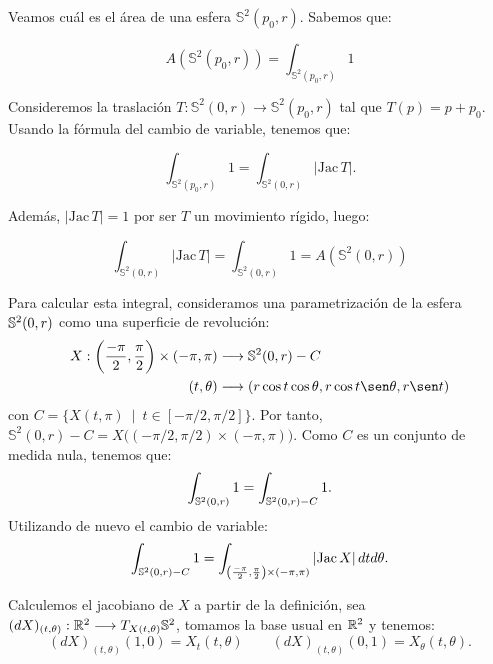 \begin{remark}
Veamos cuál es el área de una esfera $\mathbb{S}^2(p_0, r)$. Sabemos que:

\begin{equation*}
    A(\mathbb{S}^2(p_0, r)) = \int_{\mathbb{S}^2(p_0, r)} 1
\end{equation*}

Consideremos la traslación $T: \mathbb{S}^2(0, r) \longrightarrow \mathbb{S}^2(p_0, r)$ tal que $T(p) = p + p_0$. Usando la fórmula del cambio de variable, tenemos que:

\begin{equation*}
    \int_{\mathbb{S}^2(p_0, r)} 1 = \int_{\mathbb{S}^2(0, r)} |\text{Jac} \, T|.
\end{equation*}

Además, $|\text{Jac} \, T|=1$ por ser $T$ un movimiento rígido, luego:

\begin{equation*}
    \int_{\mathbb{S}^2(0, r)} |\text{Jac} \, T| = \int_{\mathbb{S}^2(0, r)} 1 = A(\mathbb{S}^2(0, r))
\end{equation*}

Para calcular esta integral, consideramos una parametrización de la esfera $\mathbb{S}^2 (0,r)$ como una superficie de revolución: 
%
\begin{align*}
    X: \left( \frac{-\pi}{2}, \frac{\pi}{2} \right) \times (-\pi, \pi) &\longrightarrow \mathbb{S}^2(0, r) - C \\
    (t, \theta) &\longrightarrow (r\cos t\cos\theta, r\cos t\sen\theta, r\sen t)
\end{align*}
%
con $C = \{X(t,\pi) \enspace | \enspace t\in [-\pi/2, \pi/2]\}$. Por tanto, $\mathbb{S}^2(0, r) - C = X \big( (-\pi/2, \pi/2) \times (-\pi, \pi) \big)$. Como $C$ es un conjunto de medida nula, tenemos que:
%
\begin{equation*}
    \int_{\mathbb{S}^2(0, r)} 1 = \int_{\mathbb{S}^2(0, r) - C} 1.
\end{equation*}
%
Utilizando de nuevo el cambio de variable:
%
\begin{equation*}
    \int_{\mathbb{S}^2(0, r) - C} 1 = \int_{ \left( \frac{-\pi}{2}, \frac{\pi}{2} \right) \times (-\pi, \pi)} |\text{Jac} \, X| \, dtd\theta.
\end{equation*}

Calculemos el jacobiano de $X$ a partir de la definición, sea $(dX)_{(t, \theta)}: \mathbb{R}^2 \longrightarrow T_{X(t,\theta)} \mathbb{S}^2$, tomamos la base usual en $\mathbb{R}^2$ y tenemos:
%
\begin{equation*}
    (dX)_{(t, \theta)}(1,0) = X_t(t, \theta) \qquad (dX)_{(t, \theta)}(0,1) = X_\theta(t, \theta).
\end{equation*}


\end{remark}
